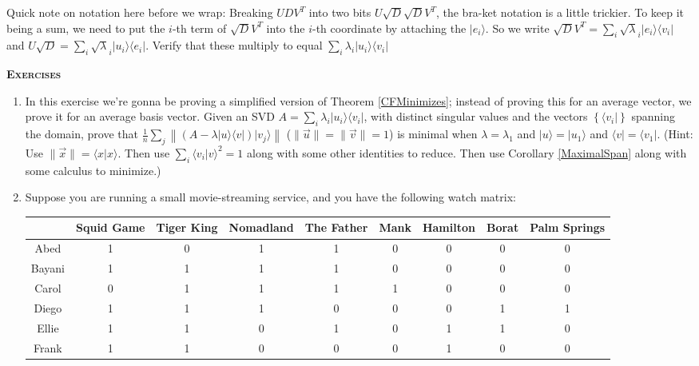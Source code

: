 \documentclass{amsbook}
\begin{document}
Quick note on notation here before we wrap:  Breaking $UDV^T$ into two bits $U\sqrt D\sqrt DV^T$, the bra-ket notation is a little trickier.  To keep it being a sum, we need to put the $i$-th term of $\sqrt DV^T$ into the $i$-th coordinate by attaching the $|e_i\rangle$.  So we write $\sqrt DV^T=\sum_i\sqrt\lambda_i|e_i\rangle\langle v_i|$ and $U\sqrt D=\sum_i\sqrt\lambda_i|u_i\rangle\langle e_i|$.  Verify that these multiply to equal $\sum_i\lambda_i|u_i\rangle\langle v_i|$

{\bfseries\scshape\Large Exercises}

\begin{enumerate}
\item \label{Ex-CFMinimizes Simplified} In this exercise we're gonna be proving a simplified version of Theorem \ref{CFMinimizes}; instead of proving this for an average vector, we prove it for an average basis vector.  Given an SVD $A=\sum_i\lambda_i|u_i\rangle\langle v_i|$, with distinct singular values and the vectors $\left\{\langle v_i|\right\}$ spanning the domain, prove that $\frac{1}{n}\sum_j\left\|\left(A-\lambda|u\rangle\langle v|\right)|v_j\rangle\right\|$ ($\|\vec u\|=\|\vec v\|=1$) is minimal when $\lambda=\lambda_1$ and $|u\rangle=|u_1\rangle$ and $\langle v|=\langle v_1|$.  (Hint: Use $\|\vec x\|=\langle x|x\rangle$.  Then use $\sum_i\langle v_i|v\rangle^2 = 1$ along with some other identities to reduce.  Then use Corollary \ref{MaximalSpan} along with some calculus to minimize.)
\item Suppose you are running a small movie-streaming service, and you have the following watch matrix:

\begin{tabular}{ccccccccc}
& Squid Game & Tiger King & Nomadland & The Father & Mank & Hamilton & Borat & Palm Springs \\
\hline

Abed & 1&0&1&1&0&0&0&0 \\
Bayani & 1&1&1&1&0&0&0&0 \\
Carol & 0&1&1&1&1&0&0&0 \\
Diego & 1&1&1&0&0&0&1&1 \\
Ellie & 1&1&0&1&0&1&1&0 \\
Frank & 1&1&0&0&0&1&0&0
\end{tabular}


\end{enumerate}
\end{document}
